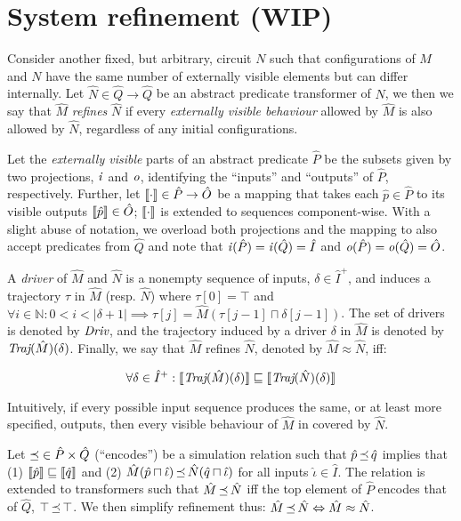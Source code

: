 \section{System refinement (WIP)}

Consider another fixed, but arbitrary, circuit $N$ such that configurations of $M$ and $N$ have the same number of externally visible elements but can differ internally. Let $\hat N \in \hat Q \rightarrow \hat Q$ be an abstract predicate transformer of $N$, we then we say that $\hat M$ \textit{refines} $\hat N$ if every \textit{externally visible behaviour} allowed by $\hat M$ is also allowed by $\hat N$, regardless of any initial configurations.

Let the \textit{externally visible} parts of an abstract predicate $\hat P$ be the subsets given by two projections, $\operatorname{\mathit{i}}$ and $\mathit{o}$, identifying the ``inputs'' and ``outputs'' of $\hat P$, respectively. Further, let $\llbracket\cdot\rrbracket \in \hat P \rightarrow \hat O$ be a mapping that takes each $\hat p \in \hat P$ to its visible outputs $\llbracket\hat p\rrbracket \in \hat O$; $\llbracket\cdot\rrbracket$ is extended to sequences component-wise. With a slight abuse of notation, we overload both projections and the mapping to also accept predicates from $\hat Q$ and note that $\operatorname{\mathit{i}}(\hat P) = \operatorname{\mathit{i}}(\hat Q) = \hat I$ and $\mathit{o}(\hat P) = \mathit{o}(\hat Q) = \hat O$.


A \textit{driver} of $\hat M$ and $\hat N$ is a nonempty sequence of inputs, $\delta \in \hat I^{+}$, and induces a trajectory $\tau$ in $\hat M$ (resp. $\hat N$) where $\tau[0] = \top$ and $\forall i \in \mathbb{N} : 0 < i < | \delta + 1 | \implies \tau[j] = \hat M(\tau[j-1] \sqcap \delta[j-1])$. The set of drivers is denoted by $\operatorname{\textit{Driv}}$, and the trajectory induced by a driver $\delta$ in $\hat M$ is denoted by $\operatorname{\textit{Traj}}(\hat M)(\delta)$. Finally, we say that $\hat M$ refines $\hat N$, denoted by $\hat M \approx \hat N$, iff:

\begin{equation*}
\forall \delta \in \hat I^{+} : \llbracket\operatorname{\textit{Traj}}(\hat M)(\delta)\rrbracket \sqsubseteq \llbracket\operatorname{\textit{Traj}}(\hat N)(\delta)\rrbracket
\end{equation*}

\noindent Intuitively, if every possible input sequence produces the same, or at least more specified, outputs, then every visible behaviour of $\hat M$ in covered by $\hat N$.

Let $\operatorname{\preceq} \in \hat P \times \hat Q$ (``encodes'') be a simulation relation such that $\hat p \operatorname{\preceq} \hat q$ implies that (1) $\llbracket\hat p\rrbracket \sqsubseteq \llbracket\hat q\rrbracket$ and (2) $\hat M(\hat p \sqcap \hat \iota) \operatorname{\preceq} \hat N(\hat q \sqcap \hat \iota)$ for all inputs $\hat \iota \in \hat I$. The relation is extended to transformers such that $\hat M \operatorname{\preceq} \hat N$ iff the top element of $\hat P$ encodes that of $\hat Q$, $\top \operatorname{\preceq} \top$. We then simplify refinement thus: $\hat M \operatorname{\preceq} \hat N \Leftrightarrow \hat M \approx \hat N$.

